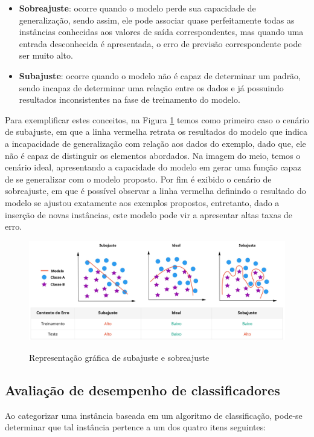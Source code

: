\documentclass[
	12pt,				%
	oneside,			%
	a4paper,			%
	english,			%
	brazil				%
	]{abntex2ppgsi}
\begin{document}
\begin{itemize}
  \item \textbf{Sobreajuste}: ocorre quando o modelo perde sua capacidade de generalização, sendo assim, ele pode associar quase perfeitamente todas as instâncias conhecidas aos valores de saída correspondentes, mas quando uma entrada desconhecida é apresentada, o erro de previsão correspondente pode ser muito alto.

  \item \textbf{Subajuste}: ocorre quando o modelo não é capaz de determinar um padrão, sendo incapaz de determinar uma relação entre os dados e já possuindo resultados inconsistentes na fase de treinamento do modelo.
\end{itemize}

Para exemplificar estes conceitos, na Figura \ref{fig:subajuste_sobreajuste} temos como primeiro caso o cenário de subajuste, em que a linha vermelha retrata os resultados do modelo que indica a incapacidade de generalização com relação aos dados do exemplo, dado que, ele não é capaz de distinguir os elementos abordados. Na imagem do meio, temos o cenário ideal, apresentando a capacidade do modelo em gerar uma função capaz de se generalizar com o modelo proposto. Por fim é exibido o cenário de sobreajuste, em que é possível observar a linha vermelha definindo o resultado do modelo se ajustou exatamente aos exemplos propostos, entretanto, dado a inserção de novas instâncias, este modelo pode vir a apresentar altas taxas de erro.

\begin{figure}[H]
    \centering
    \caption{Representação gráfica de subajuste e sobreajuste}
    \includegraphics[width=1\textwidth]{imagens/conceitos_basicos/subajuste_sobreajuste.jpg}
    \label{fig:subajuste_sobreajuste}
\end{figure}

\subsection{Avaliação de desempenho de classificadores}
Ao categorizar uma instância baseada em um algoritmo de classificação, pode-se determinar que tal instância pertence a um dos quatro itens seguintes:
\end{document}
